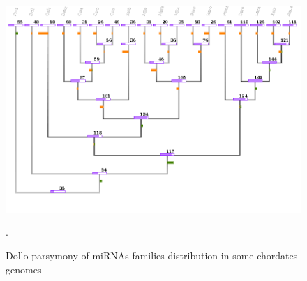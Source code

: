 \documentclass[11pt]{article}
\begin{document}
\begin{figure}[ht]
\centering
\includegraphics[width=\textwidth]{./Images/finalTree.png}
\caption{Dollo parsymony of miRNAs families distribution in some 
chordates genomes}.
\label{fig:dollotree}
\end{figure}

\newpage



\end{document}
